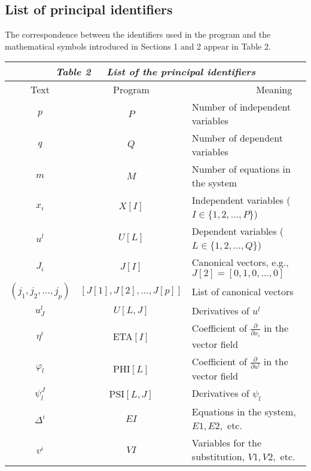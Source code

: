 {\pagebreak
\subsection{List of principal identifiers}
The correspondence between the identifiers used in the program 
and the mathematical symbols introduced in Sections 1 and 2 appear in Table 2.

\nopagebreak
\begin{center}
\begin{tabular}{||c|c|l||} \hline \hline
\multicolumn{3}{||c||}{\em Table 2 $\;\;\;$ 
List of the principal identifiers} \\ \hline
Text  & Program & $\;\;\;\;\;\;\;\;\;\;\;\;\;\;\;\;\;\;\;\;\;\;\;$ 
Meaning \\ \hline \hline 
$p $    &  $ P$  & Number of independent variables  \\ \hline
$q $    &  $ Q$  & Number of dependent variables  \\ \hline
$m $    &  $ M$  & Number of equations in the system  \\ \hline
$x_i $ & $ X[I]$ & Independent variables ($I \in \{ 1,2, ... , P \}$) \\ \hline
$u^l$  & $ U[L]$ & Dependent variables ($ L \in \{ 1,2, ... , Q \}$) \\ \hline
$J_{i}$ & $J[I] $   & Canonical vectors, e.g., $J[2]=[0,1,0,...,0] $  \\ \hline
$(j_1 , j_2, ... , j_p ) $ & $[J[1] , J[2], ..., J[p] ]$
&List of canonical vectors\\ \hline
$ u^{l}_{J}$ & $ U[L,J]$   & Derivatives of $u^{l}$  \\ \hline
$ \eta^{i}$ & ETA$[I]$    & Coefficient of 
                            $\textstyle \frac{\partial}{\partial x_i }$
in the vector field  \\ \hline
$ \varphi_{l}$ & PHI$[L] $ & Coefficient of 
                             $\textstyle \frac{\partial}{\partial u^l }$
in the vector field   \\ \hline
$ \psi^{J}_{l}$ & PSI$[L,J] $ & Derivatives of $\psi_{l}$  \\ \hline
$ \Delta^{i}$ &$EI$ & Equations in the system, $E1, E2,$ etc. \\ \hline
$ v^{i}$  & $VI$ & Variables for the substitution, $V1, V2,$ etc. \\ \hline
\hline
\end{tabular}
\end{center}

\nopagebreak
}
